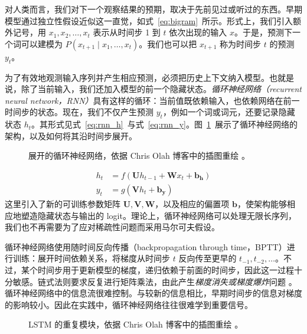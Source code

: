 对人类而言，我们对下一个观察结果的预期，取决于先前见过或听过的东西。早期模型通过独立性假设近似这一直觉，如式~\ref{eq:bigram}~所示。形式上，我们引入额外记号，用 $x_1, x_2, \dots, x_t$ 表示从时间步 1 到 $t$ 依次出现的输入 $x$。于是，预测下一个词可以建模为 $P(x_{t+1} \mid x_1, \dots, x_t)$。我们也可以把 $x_{t+1}$ 称为时间步 $t$ 的预测 $y_{t}$。

为了有效地观测输入序列并产生相应预测，必须把历史上下文纳入模型。也就是说，除了当前输入，我们还加入模型的前一个隐藏状态。\emph{循环神经网络（recurrent neural network，RNN）}具有这样的循环：当前值既依赖输入，也依赖网络在前一时间步的状态。现在，我们不仅产生预测 $y_t$，例如一个词或词元，还要记录隐藏状态 $h_t$。其形式见式~\ref{eq:rnn_h}~与式~\ref{eq:rnn_y}。图~\ref{fig:rnn}~展示了循环神经网络的架构，以及如何将其沿时间步展开。
\begin{figure}[tb]
    \centering
    
    \caption{展开的循环神经网络，依据 Chris Olah 博客中的插图重绘 \citep{olah2015understanding}。}
    \label{fig:rnn}
\end{figure}
\begin{align}
    \label{eq:rnn_h}
    h_t &= f(\mathbf{U}h_{t-1} + \mathbf{W}x_t + \mathbf{b_h})\\
    \label{eq:rnn_y}
    y_t &= g(\mathbf{V}h_t + \mathbf{b_y})
\end{align}
这里引入了新的可训练参数矩阵 $\mathbf{U}, \mathbf{V}, \mathbf{W}$，以及相应的偏置项 $\mathbf{b}$，使架构能够相应地塑造隐藏状态与输出的 logit。理论上，循环神经网络可以处理无限长序列，我们也不再需要为了应对稀疏性问题而采用马尔可夫假设。

循环神经网络使用随时间反向传播（backpropagation through time，BPTT）进行训练：展开时间依赖关系，将梯度从时间步 $t$ 反向传至更早的 $t_{-1}, t_{-2}, \dots$。不过，某个时间步用于更新模型的梯度，递归依赖于前面的时间步，因此这一过程十分敏感。链式法则要求反复进行矩阵乘法，由此产生\emph{梯度消失或梯度爆炸}问题 \citep{bengio1994learning, pmlr-v28-pascanu13}。循环神经网络中的信息流很难控制。与较新的信息相比，早期时间步的信息对梯度的影响较小。因此在实践中，循环神经网络往往很难学到重要信号。

\begin{figure}[tb]
    \centering
    
    \caption{LSTM 的重复模块，依据 Chris Olah 博客中的插图重绘 \citep{olah2015understanding}。}
    \label{fig:lstm}
\end{figure}

